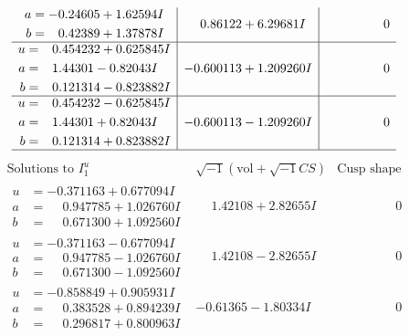 \documentclass[1p]{elsarticle_modified}
\theoremstyle{definition}
\newcommand{\I}{\sqrt{-1}}
\begin{document}
$$\begin{array}{c|c|c}
\begin{aligned}
a &= -0.24605 + 1.62594 I \\
b &= \phantom{-}0.42389 + 1.37878 I\end{aligned}
 & \phantom{-}0.86122 + 6.29681 I & \phantom{-0.000000 } 0 \\ \hline\begin{aligned}
u &= \phantom{-}0.454232 + 0.625845 I \\
a &= \phantom{-}1.44301 - 0.82043 I \\
b &= \phantom{-}0.121314 - 0.823882 I\end{aligned}
 & -0.600113 + 1.209260 I & \phantom{-0.000000 } 0 \\ \hline\begin{aligned}
u &= \phantom{-}0.454232 - 0.625845 I \\
a &= \phantom{-}1.44301 + 0.82043 I \\
b &= \phantom{-}0.121314 + 0.823882 I\end{aligned}
 & -0.600113 - 1.209260 I & \phantom{-0.000000 } 0\\
 \hline 
 \end{array}$$\newpage$$\begin{array}{c|c|c}  
\text{Solutions to }I^u_{1}& \I (\text{vol} + \sqrt{-1}CS) & \text{Cusp shape}\\
 \hline 
\begin{aligned}
u &= -0.371163 + 0.677094 I \\
a &= \phantom{-}0.947785 + 1.026760 I \\
b &= \phantom{-}0.671300 + 1.092560 I\end{aligned}
 & \phantom{-}1.42108 + 2.82655 I & \phantom{-0.000000 } 0 \\ \hline\begin{aligned}
u &= -0.371163 - 0.677094 I \\
a &= \phantom{-}0.947785 - 1.026760 I \\
b &= \phantom{-}0.671300 - 1.092560 I\end{aligned}
 & \phantom{-}1.42108 - 2.82655 I & \phantom{-0.000000 } 0 \\ \hline\begin{aligned}
u &= -0.858849 + 0.905931 I \\
a &= \phantom{-}0.383528 + 0.894239 I \\
b &= \phantom{-}0.296817 + 0.800963 I\end{aligned}
 & -0.61365 - 1.80334 I & \phantom{-0.000000 } 0 \\ \hline\begin{aligned}

\end{aligned}
\end{array}$$
\end{document}
